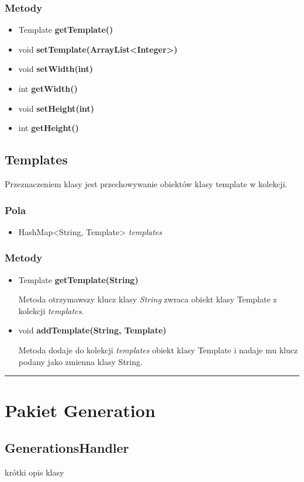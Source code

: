 \documentclass[a4paper,11pt]{article}
\newcommand{\linia}{\rule{\linewidth}{0.4mm}}
\begin{document}
\subsubsection{Metody}
\begin{itemize}
\item Template \textbf{getTemplate()}
\item void \textbf{setTemplate(ArrayList<Integer>)}
\item void \textbf{setWidth(int)}
\item int \textbf{getWidth()}
\item void \textbf{setHeight(int)}
\item int \textbf{getHeight()}
\end{itemize}


\subsection{Templates}
Przeznaczeniem klasy jest przechowywanie obiektów klasy template w kolekcji.
\subsubsection{Pola}
\begin{itemize}
\item HashMap<String, Template> \textit{templates}
\end{itemize}
\subsubsection{Metody}
\begin{itemize}
\item Template \textbf{getTemplate(String)}

Metoda otrzymawszy klucz klasy \textit{String} zwraca obiekt klasy Template z kolekcji \textit{templates}.
\item void \textbf{addTemplate(String, Template)}

Metoda dodaje do kolekcji \textit{templates} obiekt klasy Template i nadaje mu klucz podany jako zmienna klasy String.
\end{itemize}
\noindent\linia

\section{Pakiet Generation}



\subsection{GenerationsHandler}
krótki opis klasy
\end{document}
